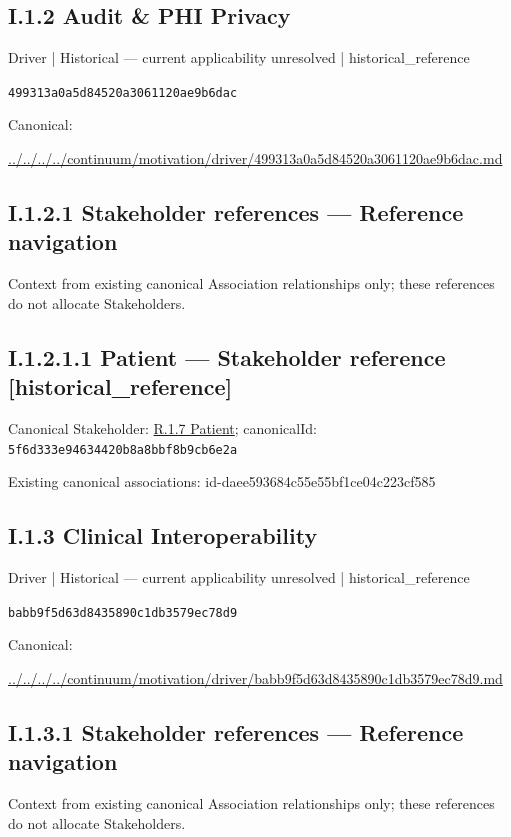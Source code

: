 \documentclass[10pt,a4paper]{article}
\begin{document}
\subsection*{I.1.2 Audit \& PHI Privacy}
\label{element-499313a0a5d84520a3061120ae9b6dac}
{\small Driver | Historical — current applicability unresolved | historical\_reference}\par
\texttt{499313a0a5d84520a3061120ae9b6dac}\par
Canonical: \par
{\footnotesize\url{../../../../continuum/motivation/driver/499313a0a5d84520a3061120ae9b6dac.md}}\par
\subsection*{I.1.2.1 Stakeholder references — Reference navigation}
Context from existing canonical Association relationships only; these references do not allocate Stakeholders.\par
\subsection*{I.1.2.1.1 Patient — Stakeholder reference [historical\_reference]}
Canonical Stakeholder: \hyperref[element-5f6d333e94634420b8a8bbf8b9cb6e2a]{R.1.7 Patient}; canonicalId: \texttt{5f6d333e94634420b8a8bbf8b9cb6e2a}\par
Existing canonical associations: id-daee593684c55e55bf1ce04c223cf585\par
\subsection*{I.1.3 Clinical Interoperability}
\label{element-babb9f5d63d8435890c1db3579ec78d9}
{\small Driver | Historical — current applicability unresolved | historical\_reference}\par
\texttt{babb9f5d63d8435890c1db3579ec78d9}\par
Canonical: \par
{\footnotesize\url{../../../../continuum/motivation/driver/babb9f5d63d8435890c1db3579ec78d9.md}}\par
\subsection*{I.1.3.1 Stakeholder references — Reference navigation}
Context from existing canonical Association relationships only; these references do not allocate Stakeholders.\par
\end{document}
